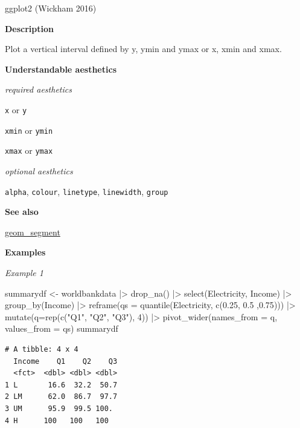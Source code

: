 \documentclass[
  letterpaper,
  DIV=11,
  numbers=noendperiod]{scrreprt}
\newenvironment{Shaded}{\begin{snugshade}}{\end{snugshade}}
\newcommand{\AttributeTok}[1]{\textcolor[rgb]{0.40,0.45,0.13}{#1}}
\newcommand{\DecValTok}[1]{\textcolor[rgb]{0.68,0.00,0.00}{#1}}
\newcommand{\FloatTok}[1]{\textcolor[rgb]{0.68,0.00,0.00}{#1}}
\newcommand{\FunctionTok}[1]{\textcolor[rgb]{0.28,0.35,0.67}{#1}}
\newcommand{\NormalTok}[1]{\textcolor[rgb]{0.00,0.23,0.31}{#1}}
\newcommand{\OtherTok}[1]{\textcolor[rgb]{0.00,0.23,0.31}{#1}}
\newcommand{\SpecialCharTok}[1]{\textcolor[rgb]{0.37,0.37,0.37}{#1}}
\newcommand{\StringTok}[1]{\textcolor[rgb]{0.13,0.47,0.30}{#1}}
\begin{document}
ggplot2 (Wickham 2016)

\textbf{Description}

Plot a vertical interval defined by y, ymin and ymax or x, xmin and
xmax.

\textbf{Understandable aesthetics}

\emph{required aesthetics}

\texttt{x} or \texttt{y}

\texttt{xmin} or \texttt{ymin}

\texttt{xmax} or \texttt{ymax}

\emph{optional aesthetics}

\texttt{alpha}, \texttt{colour}, \texttt{linetype}, \texttt{linewidth},
\texttt{group}

\textbf{See also}

\hyperref[segment]{geom\_segment}

\textbf{Examples}

\emph{Example 1}

\begin{Shaded}
\begin{Highlighting}[]
\NormalTok{summarydf }\OtherTok{\textless{}{-}}\NormalTok{ worldbankdata }\SpecialCharTok{|\textgreater{}}
  \FunctionTok{drop\_na}\NormalTok{() }\SpecialCharTok{|\textgreater{}}
  \FunctionTok{select}\NormalTok{(Electricity, Income) }\SpecialCharTok{|\textgreater{}}
  \FunctionTok{group\_by}\NormalTok{(Income) }\SpecialCharTok{|\textgreater{}}
  \FunctionTok{reframe}\NormalTok{(}\AttributeTok{qs =} \FunctionTok{quantile}\NormalTok{(Electricity, }\FunctionTok{c}\NormalTok{(}\FloatTok{0.25}\NormalTok{, }\FloatTok{0.5}\NormalTok{ ,}\FloatTok{0.75}\NormalTok{))) }\SpecialCharTok{|\textgreater{}}
  \FunctionTok{mutate}\NormalTok{(}\AttributeTok{q=}\FunctionTok{rep}\NormalTok{(}\FunctionTok{c}\NormalTok{(}\StringTok{"Q1"}\NormalTok{, }\StringTok{"Q2"}\NormalTok{, }\StringTok{"Q3"}\NormalTok{), }\DecValTok{4}\NormalTok{)) }\SpecialCharTok{|\textgreater{}}
  \FunctionTok{pivot\_wider}\NormalTok{(}\AttributeTok{names\_from =}\NormalTok{ q,}
              \AttributeTok{values\_from =}\NormalTok{ qs)}
\NormalTok{summarydf}
\end{Highlighting}
\end{Shaded}

\begin{verbatim}
# A tibble: 4 x 4
  Income    Q1    Q2    Q3
  <fct>  <dbl> <dbl> <dbl>
1 L       16.6  32.2  50.7
2 LM      62.0  86.7  97.7
3 UM      95.9  99.5 100. 
4 H      100   100   100  
\end{verbatim}
\end{document}
